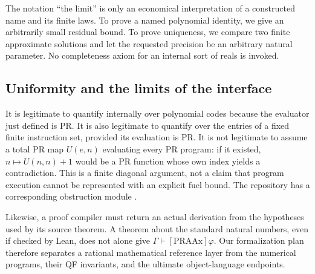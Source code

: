 The notation ``the limit'' is only an economical interpretation of a constructed name and its finite laws. To prove a named polynomial identity, we give an arbitrarily small residual bound. To prove uniqueness, we compare two finite approximate solutions and let the requested precision be an arbitrary natural parameter. No completeness axiom for an internal sort of reals is invoked.

\subsection{Uniformity and the limits of the interface}

It is legitimate to quantify internally over polynomial codes because the evaluator just defined is PR. It is also legitimate to quantify over the entries of a fixed finite instruction set, provided its evaluation is PR. It is not legitimate to assume a total PR map \(U(e,n)\) evaluating every PR program: if it existed, \(n\mapsto U(n,n)+1\) would be a PR function whose own index yields a contradiction. This is a finite diagonal argument, not a claim that program execution cannot be represented with an explicit fuel bound. The repository has a corresponding obstruction module \cite{repo-evaluator}.

Likewise, a proof compiler must return an actual derivation from the hypotheses used by its source theorem. A theorem about the standard natural numbers, even if checked by Lean, does not alone give \(\Gamma\vdash[\mathrm{PRAAx}]\varphi\). Our formalization plan therefore separates a rational mathematical reference layer from the numerical programs, their QF invariants, and the ultimate object-language endpoints.
